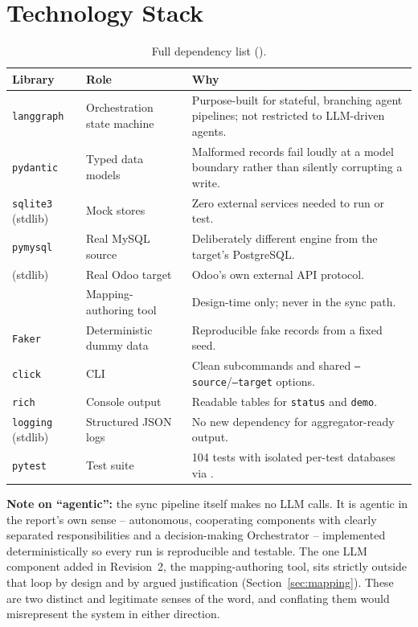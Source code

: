 \documentclass[11pt,a4paper]{article}
\newcommand{\ttu}[1]{\texttt{\detokenize{#1}}}
\begin{document}
\section{Technology Stack}

\begin{table}[H]
\centering
\small
\begin{tabular}{@{}p{2.4cm}p{3.2cm}p{7.4cm}@{}}
\toprule
\textbf{Library} & \textbf{Role} & \textbf{Why} \\
\midrule
\texttt{langgraph} & Orchestration state machine & Purpose-built for stateful, branching agent
pipelines; not restricted to LLM-driven agents. \\
\texttt{pydantic} & Typed data models & Malformed records fail loudly at a model boundary rather
than silently corrupting a write. \\
\texttt{sqlite3} (stdlib) & Mock stores & Zero external services needed to run or test. \\
\texttt{pymysql} & Real MySQL source & Deliberately different engine from the target's
PostgreSQL. \\
\ttu{xmlrpc.client} (stdlib) & Real Odoo target & Odoo's own external API protocol. \\
\ttu{google-genai} & Mapping-authoring tool & Design-time only; never in the sync path. \\
\texttt{Faker} & Deterministic dummy data & Reproducible fake records from a fixed seed. \\
\texttt{click} & CLI & Clean subcommands and shared \texttt{--source}/\texttt{--target} options. \\
\texttt{rich} & Console output & Readable tables for \texttt{status} and \texttt{demo}. \\
\texttt{logging} (stdlib) & Structured JSON logs & No new dependency for aggregator-ready output. \\
\texttt{pytest} & Test suite & 104 tests with isolated per-test databases via \ttu{tmp_path}. \\
\bottomrule
\end{tabular}
\caption{Full dependency list (\ttu{requirements.txt}).}
\end{table}

\textbf{Note on ``agentic'':} the sync pipeline itself makes no LLM calls. It is agentic in the
report's own sense -- autonomous, cooperating components with clearly separated responsibilities
and a decision-making Orchestrator -- implemented deterministically so every run is reproducible
and testable. The one LLM component added in Revision~2, the mapping-authoring tool, sits
strictly outside that loop by design and by argued justification (Section~\ref{sec:mapping}).
These are two distinct and legitimate senses of the word, and conflating them would misrepresent
the system in either direction.
\end{document}
